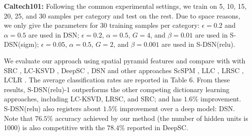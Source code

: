 \documentclass[letterpaper]{article}
\begin{document}
\textbf{Caltech101:}
Following the common experimental settings, we train on 5, 10, 15, 20, 25, and 30 samples per category and test on the rest. Due to space reasons, we only give the parameters for 30 training samples per category: $\epsilon=0.2$ and $\alpha=0.5$ are used in DSN; $\epsilon=0.2$, $\alpha=0.5$, $G=4$, and $\beta=0.01$ are used in S-DSN(sigm); $\epsilon=0.05$, $\alpha=0.5$, $G=2$, and $\beta=0.001$ are used in S-DSN(relu).

We evaluate our approach using spatial pyramid features and compare with with SRC \cite{Wright2009}, LC-KSVD \cite{Jiang2013}, DeepSC \cite{He2014}, DSN \cite{Deng2011b} and other approaches ScSPM \cite{Yangjc2009}, LLC \cite{Wang2010}, LRSC \cite{Zhangt2013}, LCLR \cite{Jiang2014}. The average classification rates are reported in Table 6. From these results, S-DSN(relu)-1 outperforms the other competing dictionary learning approaches, including LC-KSVD, LRSC, and SRC; and has $1.6\%$ improvement. S-DSN(relu) also registers about $1.5\%$ improvement over a deep model: DSN. Note that $76.5\%$ accuracy achieved by our method (the number of hidden units is 1000) is also competitive with the $78.4\%$ reported in DeepSC.
\end{document}
